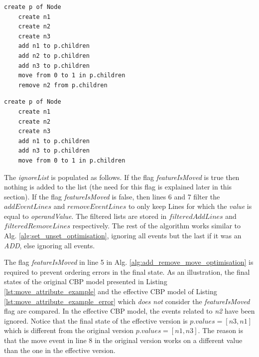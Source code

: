 \documentclass[12pt, a4paper]{report} \usepackage[titletoc]{appendix}
\begin{document}
\noindent
\begin{minipage}[t]{0.48\linewidth}
	\begin{lstlisting}[style=eol,caption={The CBP representation of reference \emph{children}'s move event.},label=lst:move_attribute_example]
	create p of Node
	create n1
	create n2
	create n3
	add n1 to p.children
	add n2 to p.children
	add n3 to p.children
	move from 0 to 1 in p.children
	remove n2 from p.children
	\end{lstlisting}
\end{minipage}
\hfill
\begin{minipage}[t]{0.48\linewidth}
	\begin{lstlisting}[style=eol,caption={The effective CBP representation of reference \emph{children}'s move event.},label=lst:move_attribute_example_error]
	create p of Node
	create n1
	create n2
	create n3
	add n1 to p.children
	add n3 to p.children
	move from 0 to 1 in p.children
	\end{lstlisting}
\end{minipage}

The \emph{ignoreList} is populated as follows. If the flag \emph{featureIsMoved} is true then nothing is added to the list (the need for this flag is explained later in this section). If the flag \emph{featureIsMoved} is false, then lines 6 and 7 filter the $addEventLines$ and $removeEventLines$ to only keep Lines for which the \emph{value} is equal to \emph{operandValue}. The filtered lists are stored in $filteredAddLines$ and $filteredRemoveLines$ respectively. The rest of the algorithm works similar to Alg. \ref{alg:set_unset_optimisation}, ignoring all events but the last if it was an \emph{ADD}, else ignoring all events. 

The flag \emph{featureIsMoved} in line 5 in Alg. \ref{alg:add_remove_move_optimisation} is required to prevent ordering errors in the final state. As an illustration, the final states of the original CBP model presented in Listing  \ref{lst:move_attribute_example} and the effective CBP model of Listing \ref{lst:move_attribute_example_error} which \emph{does not} consider the \emph{featureIsMoved} flag are compared. In the effective CBP model, the events related to \emph{n2} have been ignored. Notice that the final state of the effective version is $p.values = [n3, n1]$  which is different from the original version $p.values = [n1, n3]$. The reason is that the move event in line 8 in the original version works on a different value than the one in the effective version.
\end{document}
